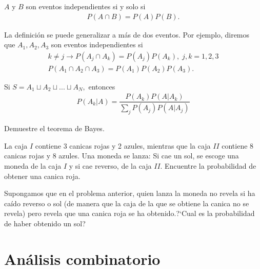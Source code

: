 \begin{defn}
 $A$ y $B$ son eventos independientes si y solo si
 \begin{align}
  \label{1.21}
  P(A \cap B) = P(A)P(B).
 \end{align}
\end{defn}


{}
La definición se puede generalizar a más de dos eventos.  Por ejemplo, diremos que $A_{1},A_{2},A_{3}$ son eventos independientes si
\begin{align}
k\neq j \rightarrow P(A_{j} \cap A_{k})=P(A_{j})P(A_{k}), \; j,k=1,2,3 
\\ P(A_{1}\cap A_{2} \cap A_{3})=P(A_{1})P(A_{2})P(A_{3}).
\end{align}


{}
\begin{thm}
 Si $S=A_{1}\sqcup A_{2} \sqcup...\sqcup A_{N},$ entonces
 \begin{align}
  \label{1.24}
  P(A_{k}|A) = \dfrac{P(A_{k})P(A|A_{k})}{\sum_{j} P(A_{j})P(A|A_{j})}
 \end{align}

\end{thm}




 \begin{ejemplo}
  \label{solved:1.16}
  Demuestre el teorema de Bayes.
 \end{ejemplo}



{}
 \begin{ejemplo}
  \label{solved:1.15}
 La caja $I$ contiene 3 canicas rojas y 2 azules, mientras que la caja $II$ contiene $8$ canicas rojas y 8 azules. Una moneda se lanza: Si cae un sol, se escoge una moneda de la caja $I$ y si cae reverso, de la caja $II.$ Encuentre la probabilidad de obtener una canica roja.
 \end{ejemplo}


{}
 \begin{ejemplo}
  \label{solved:17}
	Supongamos que en el problema anterior, quien lanza la moneda no revela si ha caído reverso o sol (de manera que la caja de la que se obtiene la canica no se revela) pero revela que una canica roja se ha obtenido.?`Cual es la probabilidad de haber obtenido un sol?
 \end{ejemplo}



\section{Análisis combinatorio}

